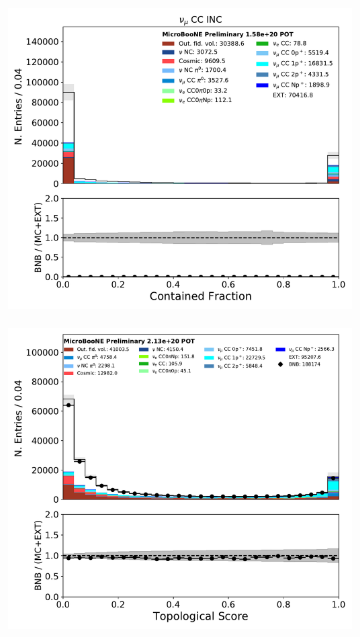 \begin{figure}[H]
    \centering
        \begin{subfigure}[b]{0.3\textwidth}
        \centering
        \includegraphics[width=\textwidth]{NuMuCCsel/Images/Ryan/appendix_presel_input_R3/contained_fraction_06122020_samples_G1_longest_detsys_event_category.pdf}
        \end{subfigure}
        \begin{subfigure}[b]{0.3\textwidth}
        \centering
        \includegraphics[width=\textwidth]{NuMuCCsel/Images/Ryan/appendix_presel_input_R3/topological_score_07262020_samples_event_category.pdf}

\end{subfigure}
\end{figure}
